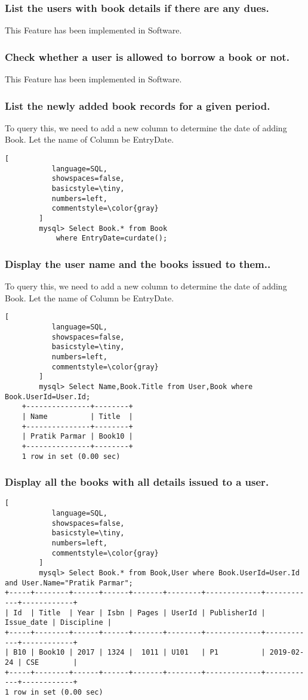 \documentclass[12pt]{article}
\begin{document}
\subsubsection*{List the users with book details if there are any dues.}
This Feature has been implemented in Software.
\subsubsection*{Check whether a user is allowed to borrow a book or not.}
This Feature has been implemented in Software.
\subsubsection*{List the newly added book records for a given period.}
To query this, we need to add a new column to determine the date of adding Book. Let the name of Column be EntryDate.
\begin{lstlisting}[
           language=SQL,
           showspaces=false,
           basicstyle=\tiny,
           numbers=left,
           commentstyle=\color{gray}
        ]
        mysql> Select Book.* from Book 
        	where EntryDate=curdate();
\end{lstlisting}
\subsubsection*{Display the user name and the books issued to them..}
To query this, we need to add a new column to determine the date of adding Book. Let the name of Column be EntryDate.
\begin{lstlisting}[
           language=SQL,
           showspaces=false,
           basicstyle=\tiny,
           numbers=left,
           commentstyle=\color{gray}
        ]
        mysql> Select Name,Book.Title from User,Book where Book.UserId=User.Id;
	+---------------+--------+
	| Name          | Title  |
	+---------------+--------+
	| Pratik Parmar | Book10 |
	+---------------+--------+
	1 row in set (0.00 sec)
\end{lstlisting}
\subsubsection*{Display all the books with all details issued to a user.}
\begin{lstlisting}[
           language=SQL,
           showspaces=false,
           basicstyle=\tiny,
           numbers=left,
           commentstyle=\color{gray}
        ]
        mysql> Select Book.* from Book,User where Book.UserId=User.Id and User.Name="Pratik Parmar";
+-----+--------+------+------+-------+--------+-------------+------------+------------+
| Id  | Title  | Year | Isbn | Pages | UserId | PublisherId | Issue_date | Discipline |
+-----+--------+------+------+-------+--------+-------------+------------+------------+
| B10 | Book10 | 2017 | 1324 |  1011 | U101   | P1          | 2019-02-24 | CSE        |
+-----+--------+------+------+-------+--------+-------------+------------+------------+
1 row in set (0.00 sec)
\end{lstlisting}
\end{document}
